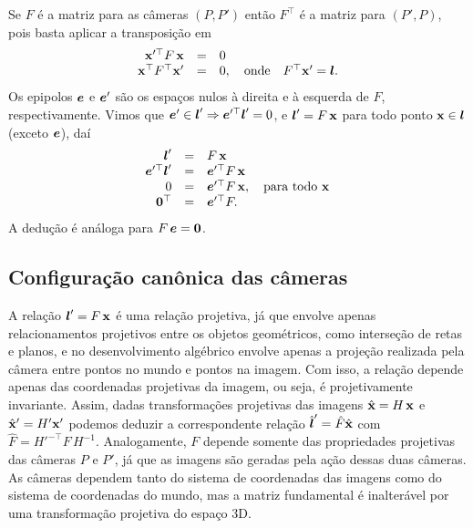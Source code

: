 Se $F$ é a matriz para as câmeras $(P,P')$ então $F^\top$ é a matriz para $(P',P)$, pois basta aplicar a transposição em 
\begin{equation*}
\begin{array}{rcl}
\mathbf{x}'^\top F\,\mathbf{x}&=&0\\
\mathbf{x}^\top F^\top\mathbf{x}'&=&0,\quad\text{onde}\quad F^\top\mathbf{x}'=\boldsymbol{l}.
\end{array}
\end{equation*}
Os epipolos $\boldsymbol{e}$ e $\boldsymbol{e}'$ são os espaços nulos à direita e à esquerda de $F$, respectivamente. Vimos que $\boldsymbol{e}'\in\boldsymbol{l}'\Rightarrow\boldsymbol{e}'^\top\boldsymbol{l}'=0$, e $\boldsymbol{l}'=F\,\mathbf{x}$ para todo ponto $\mathbf{x}\in\boldsymbol{l}$ (exceto $\boldsymbol{e}$), daí
\begin{equation*}
\begin{array}{rcl}
\boldsymbol{l}'&=&F\,\mathbf{x}\\
\boldsymbol{e}'^\top\boldsymbol{l}'&=&\boldsymbol{e}'^\top F\,\mathbf{x}\\
0&=&\boldsymbol{e}'^\top F\,\mathbf{x},\quad\text{para todo}\,\,\mathbf{x}\\
{\bf 0}^\top&=&\boldsymbol{e}'^\top F.
\end{array}
\end{equation*} 
A dedução é análoga para $F\,\boldsymbol{e}={\bf 0}$.
\subsection{Configuração canônica das câmeras}\label{sec.cameras-canonicas}
A relação $\boldsymbol{l}'=F\,\mathbf{x}$ é uma relação projetiva, já que envolve apenas relacionamentos projetivos entre os objetos geométricos, como interseção de retas e planos, e no desenvolvimento algébrico envolve apenas a projeção realizada pela câmera entre pontos no mundo e pontos na imagem. Com isso, a relação depende apenas das coordenadas projetivas da imagem, ou seja, é projetivamente invariante. Assim, dadas transformações projetivas das imagens $\hat{\mathbf{x}}=H\,\mathbf{x}$ e $\hat{\mathbf{x}}'=H'\mathbf{x}'$ podemos deduzir a correspondente relação $\hat{\boldsymbol{l}}'=\hat{F}\hat{\mathbf{x}}$ com $\hat{F}=H'^{-\top}F\,H^{-1}$. Analogamente, $F$ depende somente das propriedades projetivas das câmeras $P$ e $P'$, já que as imagens são geradas pela ação dessas duas câmeras. As câmeras dependem tanto do sistema de coordenadas das imagens como do sistema de coordenadas do mundo, mas a matriz fundamental é inalterável por uma transformação projetiva do espaço 3D. 

